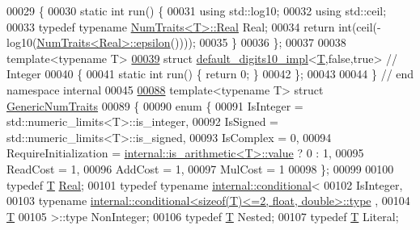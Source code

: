 \begin{DoxyCode}
00029 \{
00030   \textcolor{keyword}{static} \textcolor{keywordtype}{int} run() \{
00031     \textcolor{keyword}{using} std::log10;
00032     \textcolor{keyword}{using} std::ceil;
00033     \textcolor{keyword}{typedef} \textcolor{keyword}{typename} \hyperlink{group___sparse_core___module}{NumTraits<T>::Real} Real;
00034     \textcolor{keywordflow}{return} int(ceil(-log10(\hyperlink{group___core___module_struct_eigen_1_1_num_traits}{NumTraits<Real>::epsilon}())));
00035   \}
00036 \};
00037 
00038 \textcolor{keyword}{template}<\textcolor{keyword}{typename} T>
\hyperlink{struct_eigen_1_1internal_1_1default__digits10__impl_3_01_t_00_01false_00_01true_01_4}{00039} \textcolor{keyword}{struct }\hyperlink{struct_eigen_1_1internal_1_1default__digits10__impl}{default\_digits10\_impl}<\hyperlink{group___sparse_core___module}{T},false,true> \textcolor{comment}{// Integer}
00040 \{
00041   \textcolor{keyword}{static} \textcolor{keywordtype}{int} run() \{ \textcolor{keywordflow}{return} 0; \}
00042 \};
00043 
00044 \} \textcolor{comment}{// end namespace internal}
00045 
\hyperlink{struct_eigen_1_1_generic_num_traits}{00088} \textcolor{keyword}{template}<\textcolor{keyword}{typename} T> \textcolor{keyword}{struct }\hyperlink{struct_eigen_1_1_generic_num_traits}{GenericNumTraits}
00089 \{
00090   \textcolor{keyword}{enum} \{
00091     IsInteger = std::numeric\_limits<T>::is\_integer,
00092     IsSigned = std::numeric\_limits<T>::is\_signed,
00093     IsComplex = 0,
00094     RequireInitialization = \hyperlink{struct_eigen_1_1internal_1_1is__arithmetic}{internal::is\_arithmetic<T>::value} ? 0 : 1,
00095     ReadCost = 1,
00096     AddCost = 1,
00097     MulCost = 1
00098   \};
00099 
00100   \textcolor{keyword}{typedef} \hyperlink{group___sparse_core___module}{T} \hyperlink{group___sparse_core___module}{Real};
00101   \textcolor{keyword}{typedef} \textcolor{keyword}{typename} \hyperlink{struct_eigen_1_1internal_1_1conditional}{internal::conditional}<
00102                      IsInteger,
00103                      \textcolor{keyword}{typename} 
      \hyperlink{struct_eigen_1_1internal_1_1conditional}{internal::conditional<sizeof(T)<=2, float, double>::type}
      ,
00104                      \hyperlink{group___sparse_core___module}{T}
00105                    >::type NonInteger;
00106   \textcolor{keyword}{typedef} \hyperlink{group___sparse_core___module}{T} Nested;
00107   \textcolor{keyword}{typedef} \hyperlink{group___sparse_core___module}{T} Literal;

\end{DoxyCode}
